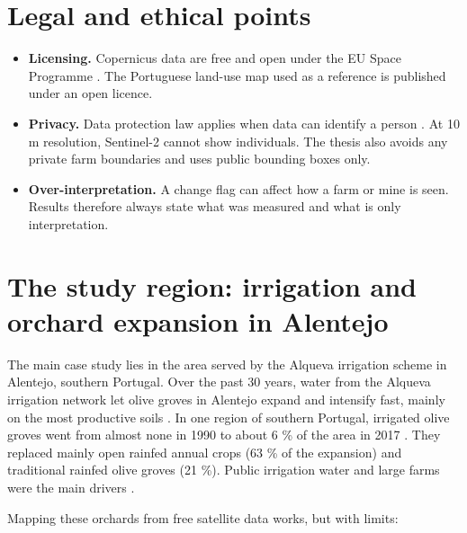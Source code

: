 \section{Legal and ethical points}

\begin{itemize}
  \item \textbf{Licensing.} Copernicus data are free and open under the EU Space Programme \cite{R256}. The Portuguese land-use map used as a reference is published under an open licence.
  \item \textbf{Privacy.} Data protection law applies when data can identify a person \cite{R257}. At 10 m resolution, Sentinel-2 cannot show individuals. The thesis also avoids any private farm boundaries and uses public bounding boxes only.
  \item \textbf{Over-interpretation.} A change flag can affect how a farm or mine is seen. Results therefore always state what was measured and what is only interpretation.

\end{itemize}
\section{The study region: irrigation and orchard expansion in Alentejo}

The main case study lies in the area served by the Alqueva irrigation scheme in Alentejo, southern Portugal. Over the past 30 years, water from the Alqueva irrigation network let olive groves in Alentejo expand and intensify fast, mainly on the most productive soils \cite{R265}. In one region of southern Portugal, irrigated olive groves went from almost none in 1990 to about 6 \% of the area in 2017 \cite{R264}. They replaced mainly open rainfed annual crops (63 \% of the expansion) and traditional rainfed olive groves (21 \%). Public irrigation water and large farms were the main drivers \cite{R264}.

Mapping these orchards from free satellite data works, but with limits:

